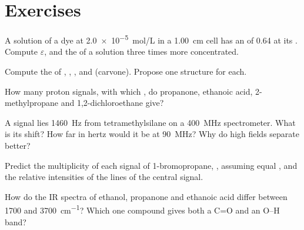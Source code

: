 \section{Exercises}

\begin{exercise}[$\star$]\label{exo:b1:structure-spectroscopy:1}
A solution of a dye at \qty{2.0e-5}{mol/L} in a \qty{1.00}{cm} cell has
an  of 0.64 at its . Compute $\varepsilon$, and
the  of a solution three times more concentrated.
\end{exercise}

\begin{exercise}[$\star$]\label{exo:b1:structure-spectroscopy:2}
Compute the  of , , ,
 and  (carvone). Propose one structure for each.
\end{exercise}

\begin{exercise}[$\star$]\label{exo:b1:structure-spectroscopy:3}
How many proton signals, with which , do propanone, ethanoic
acid, 2-methylpropane and 1,2-dichloroethane give?
\end{exercise}

\begin{exercise}[$\star$]\label{exo:b1:structure-spectroscopy:4}
A signal lies \qty{1460}{Hz} from tetramethylsilane on a
\qty{400}{MHz} spectrometer. What is its shift? How far in hertz would it
be at \qty{90}{MHz}? Why do high fields separate  better?
\end{exercise}

\begin{exercise}[$\star\star$]\label{exo:b1:structure-spectroscopy:5}
Predict the multiplicity of each signal of 1-bromopropane,
, assuming equal , and the relative
intensities of the lines of the central signal.
\end{exercise}

\begin{exercise}[$\star\star$]\label{exo:b1:structure-spectroscopy:6}
How do the IR spectra of ethanol, propanone and ethanoic acid differ
between 1700 and \qty{3700}{cm^{-1}}? Which one compound gives both
a C=O and an O--H band?
\end{exercise}

